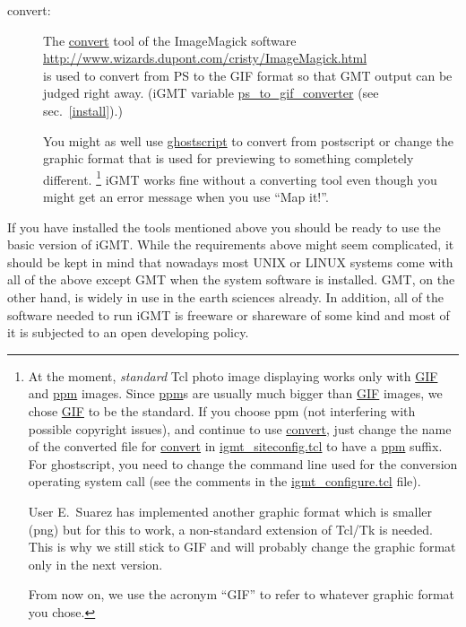 \documentclass[11pt]{article}
\begin{document}
\begin{description}
\item[convert:] The \url{convert} tool of the ImageMagick software\\

  \url{http://www.wizards.dupont.com/cristy/ImageMagick.html}\\
  
  is used to convert from PS to the GIF format so that GMT output can
  be judged right away. (iGMT variable \url{ps_to_gif_converter}
  (see sec.~\ref{install}).)
  
  You might as well use \url{ghostscript} to convert from postscript
  or change the graphic format that is used for previewing to
  something completely different. \footnote{ At the moment, {\em
      standard} Tcl photo image displaying works only with \url{GIF}
    and \url{ppm} images.  Since \url{ppm}s are usually much bigger
    than \url{GIF} images, we chose \url{GIF} to be the standard.  If
    you choose ppm (not interfering with possible copyright issues),
    and continue to use \url{convert}, just change the name of the
    converted file for \url{convert} in \url{igmt_siteconfig.tcl} to
    have a \url{ppm} suffix. For ghostscript, you need to change the
    command line used for the conversion operating system call (see
    the comments in the \url{igmt_configure.tcl} file).
    
    User E.\ Suarez has implemented another graphic format which is
    smaller (png) but for this to work, a non-standard extension of
    Tcl/Tk is needed. This is why we still stick to GIF and will
    probably change the graphic format only in the next version.
    
    From now on, we use the acronym ``GIF'' to refer to whatever
    graphic format you chose.}  iGMT works fine without a converting
  tool even though you might get an error message when you use ``Map
  it!''.


\end{description}

If you have installed the tools mentioned above you should be ready to
use the basic version of iGMT. While the requirements above might seem
complicated, it should be kept in mind that nowadays most UNIX or
LINUX systems come with all of the above except GMT when the system
software is installed. GMT, on the other hand, is widely in use in the
earth sciences already. In addition, all of the software needed to run
iGMT is freeware or shareware of some kind and most of it is subjected
to an open developing policy.
\end{document}
